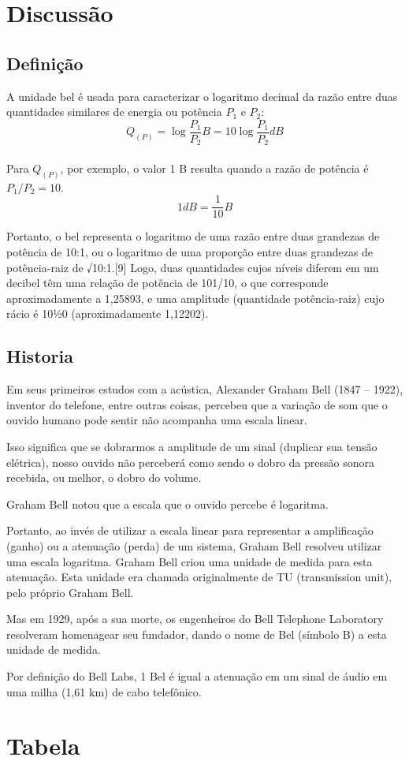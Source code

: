 \section{Discussão}

\subsection{Definição}
A unidade bel é usada para caracterizar o logaritmo decimal da razão entre duas quantidades similares de energia ou potência $P_1$ e $P_2$:\\
    $$Q_(P) = \log\frac{P_1}{P_2} B = 10 \log\frac{P_1}{P_2} dB$$\\
Para $Q_{(P)}$, por exemplo, o valor 1 B resulta quando a razão de potência é $P_1/P_2 = 10$.
$$1dB = \frac{1}{10} B$$

Portanto, o bel representa o logaritmo de uma razão entre duas grandezas de potência de 10:1, ou o logaritmo de uma proporção 
entre duas grandezas de potência-raiz de √10:1.[9] Logo, duas quantidades cujos níveis diferem em um decibel têm uma relação de potência de 101/10, 
o que corresponde aproximadamente a 1,25893, e uma amplitude (quantidade potência-raiz) cujo rácio é 101⁄20 (aproximadamente 1,12202).

\subsection{Historia}
Em seus primeiros estudos com a acústica, Alexander Graham Bell (1847 – 1922), inventor do telefone, entre outras coisas, percebeu que a variação de som que o ouvido humano pode sentir não acompanha uma escala linear.

Isso significa que se dobrarmos a amplitude de um sinal (duplicar sua tensão elétrica), nosso ouvido não perceberá como sendo o dobro da pressão sonora recebida, ou melhor, o dobro do volume.

Graham Bell notou que a escala que o ouvido percebe é logaritma.

Portanto, ao invés de utilizar a escala linear para representar a amplificação (ganho) ou a atenuação (perda) de um sistema, 
Graham Bell resolveu utilizar uma escala logaritma.
Graham Bell criou uma unidade de medida para esta atenuação. Esta unidade era chamada originalmente de TU (transmission unit), pelo próprio Graham Bell.

Mas em 1929, após a sua morte, os engenheiros do Bell Telephone Laboratory resolveram homenagear seu fundador, 
dando o nome de Bel (símbolo B) a esta unidade de medida.

Por definição do Bell Labs, 1 Bel é igual a atenuação em um sinal de áudio em uma milha (1,61 km) de cabo telefônico.

\section{Tabela}
